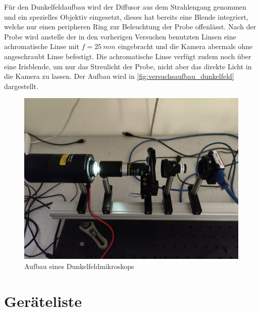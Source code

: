\documentclass[ngerman]{scrartcl}
\begin{document}
Für den Dunkelfeldaufbau wird der Diffusor aus dem Strahlengang genommen und ein spezielles Objektiv eingesetzt, dieses hat bereits eine Blende integriert, welche nur einen peripheren Ring zur Beleuchtung der Probe offenlässt. Nach der Probe wird anstelle der in den vorherigen Versuchen benutzten Linsen eine achromatische Linse mit $f = \SI{25}{mm}$ eingebracht und die Kamera abermals ohne angeschraubt Linse befestigt. Die achromatische Linse verfügt zudem noch über eine Irisblende, um nur das Streulicht der Probe, nicht aber das direkte Licht in die Kamera zu lassen. Der Aufbau wird in \autoref{fig:versuchsaufbau_dunkelfeld} dargestellt.
%
\begin{figure}[H]
    \centering
    \begin{samepage}
        \includegraphics[width=\linewidth]{fig/Dunkelfeld.jpeg}
        \caption{Aufbau eines Dunkelfeldmikroskops}
        \label{fig:versuchsaufbau_dunkelfeld}
    \end{samepage}
\end{figure}



\section{Geräteliste}
\label{sec:geraeteliste}
\end{document}
